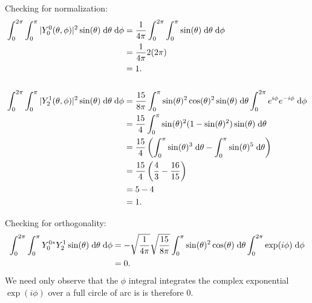 \documentclass[a4paper, 12pt]{config/homework}
\begin{document}
\begin{enumerate}
Checking for normalization:
\begin{align*}
\bint{0}{2\pi}{\bint{0}{\pi}{|Y_0^0(\theta,\phi)|^2\sin(\theta)}{\theta}}{\phi} &= \frac{1}{4\pi}\bint{0}{2\pi}{\bint{0}{\pi}{\sin(\theta)}{\theta}}{\phi}
\\&= \frac{1}{4\pi} 2 (2\pi)
\\&= 1.
\\&\\
\bint{0}{2\pi}{\bint{0}{\pi}{|Y_2^1(\theta,\phi)|^2\sin(\theta)}{\theta}}{\phi} &= \frac{15}{8\pi} \bint{0}{\pi}{\sin(\theta)^2\cos(\theta)^2\sin(\theta)}{\theta}\bint{0}{2\pi}{e^{i\phi}e^{-i\phi}}{\phi}
\\&= \frac{15}{4}\bint{0}{\pi}{\sin(\theta)^2(1-\sin(\theta)^2)\sin(\theta)}{\theta}
\\&= \frac{15}{4}\left(\bint{0}{\pi}{\sin(\theta)^3}{\theta} - \bint{0}{\pi}{\sin(\theta)^5}{\theta}\right)
\\&= \frac{15}{4}\left(\frac{4}{3} - \frac{16}{15}\right)
\\&= 5 - 4
\\&= 1.
\end{align*}

Checking for orthogonality:
\begin{align*}
\bint{0}{2\pi}{\bint{0}{\pi}{Y_0^{0*}Y_2^1\sin(\theta)}{\theta}}{\phi} &= -\sqrt{\frac{1}{4\pi}}\sqrt{\frac{15}{8\pi}}\bint{0}{\pi}{\sin(\theta)^2\cos(\theta)}{\theta}\bint{0}{2\pi}{\exp(i\phi)}{\phi}
\\&= 0.
\end{align*}
We need only observe that the \(\phi\) integral integrates the complex exponential \(\exp(i\phi)\) over a full circle of arc is is therefore 0.

\end{enumerate}
\end{document}
